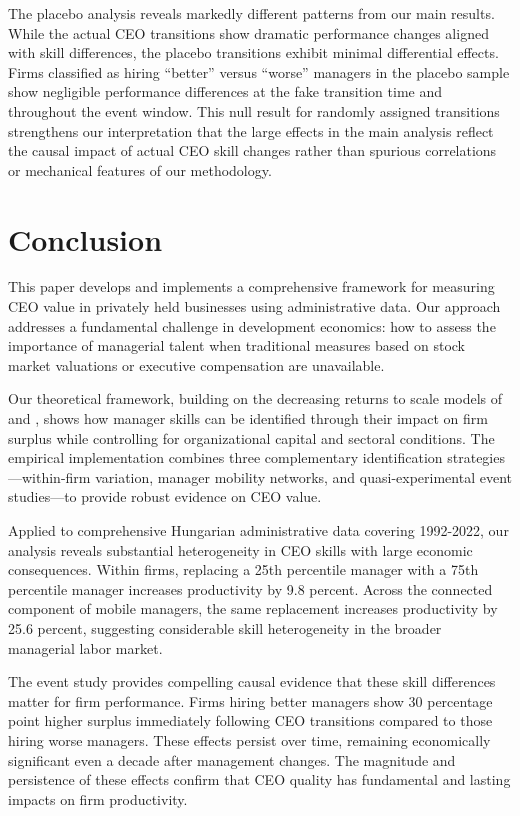 \documentclass[11pt,a4paper]{article}
\begin{document}
The placebo analysis reveals markedly different patterns from our main results. While the actual CEO transitions show dramatic performance changes aligned with skill differences, the placebo transitions exhibit minimal differential effects. Firms classified as hiring ``better'' versus ``worse'' managers in the placebo sample show negligible performance differences at the fake transition time and throughout the event window. This null result for randomly assigned transitions strengthens our interpretation that the large effects in the main analysis reflect the causal impact of actual CEO skill changes rather than spurious correlations or mechanical features of our methodology. 

\section{Conclusion}

This paper develops and implements a comprehensive framework for measuring CEO value in privately held businesses using administrative data. Our approach addresses a fundamental challenge in development economics: how to assess the importance of managerial talent when traditional measures based on stock market valuations or executive compensation are unavailable.

Our theoretical framework, building on the decreasing returns to scale models of \citet{AtkesonKehoe2005JPE} and \citet{McGrattan2012RED}, shows how manager skills can be identified through their impact on firm surplus while controlling for organizational capital and sectoral conditions. The empirical implementation combines three complementary identification strategies—within-firm variation, manager mobility networks, and quasi-experimental event studies—to provide robust evidence on CEO value.

Applied to comprehensive Hungarian administrative data covering 1992-2022, our analysis reveals substantial heterogeneity in CEO skills with large economic consequences. Within firms, replacing a 25th percentile manager with a 75th percentile manager increases productivity by 9.8 percent. Across the connected component of mobile managers, the same replacement increases productivity by 25.6 percent, suggesting considerable skill heterogeneity in the broader managerial labor market.

The event study provides compelling causal evidence that these skill differences matter for firm performance. Firms hiring better managers show 30 percentage point higher surplus immediately following CEO transitions compared to those hiring worse managers. These effects persist over time, remaining economically significant even a decade after management changes. The magnitude and persistence of these effects confirm that CEO quality has fundamental and lasting impacts on firm productivity.
\end{document}
